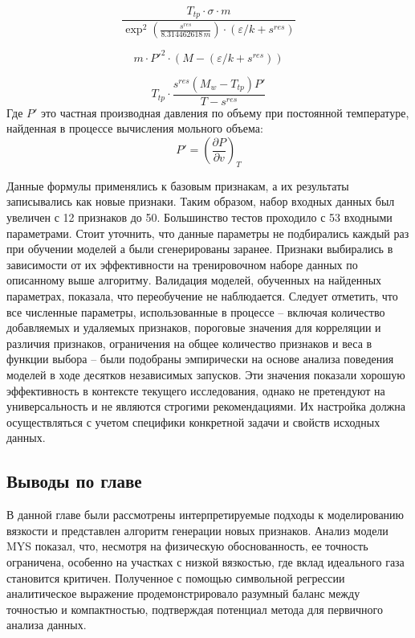 \documentclass[a4paper,12pt]{article}
\begin{document}
% 
% 

\[
\frac{T_{tp} \cdot \sigma \cdot m}
{\exp^2\left(\frac{s^{res}}{8.314462618\, m}\right) \cdot (\varepsilon/k + s^{res})}
\]

\[
m \cdot P'^2 \cdot (M - (\varepsilon/k + s^{res}))
\]

\[
T_{tp} \cdot \frac{s^{res} (M_w - T_{tp}) P'}
{T - s^{res}}
\]
  Где $P'$ это частная производная давления по объему при постоянной температуре, найденная в процессе вычисления мольного объема:
  \[
  P' = \left( \frac{\partial P}{\partial v} \right)_{T}
  \]

    Данные формулы применялись к базовым признакам, а их результаты записывались как новые признаки. Таким образом, набор входных данных был увеличен с 12 признаков до 50. Большинство тестов проходило с 53 входными параметрами. 
    Стоит уточнить, что данные параметры не подбирались каждый раз при обучении моделей а были сгенерированы заранее. Признаки выбирались в зависимости от их эффективности на тренировочном наборе данных по описанному выше алгоритму. Валидация моделей, обученных на найденных параметрах, показала, что переобучение не наблюдается.  
    Следует отметить, что все численные параметры, использованные в процессе -- включая количество добавляемых и удаляемых признаков, пороговые значения для корреляции и различия признаков, ограничения на общее количество признаков и веса в функции выбора -- были подобраны эмпирически на основе анализа поведения моделей в ходе десятков независимых запусков. Эти значения показали хорошую эффективность в контексте текущего исследования, однако не претендуют на универсальность и не являются строгими рекомендациями. Их настройка должна осуществляться с учетом специфики конкретной задачи и свойств исходных данных.

  \subsection{Выводы по главе}

    В данной главе были рассмотрены интерпретируемые подходы к моделированию вязкости и представлен алгоритм генерации новых признаков. Анализ модели MYS показал, что, несмотря на физическую обоснованность, ее точность ограничена, особенно на участках с низкой вязкостью, где вклад идеального газа становится критичен. Полученное с помощью символьной регрессии аналитическое выражение продемонстрировало разумный баланс между точностью и компактностью, подтверждая потенциал метода для первичного анализа данных.
    
\end{document}
